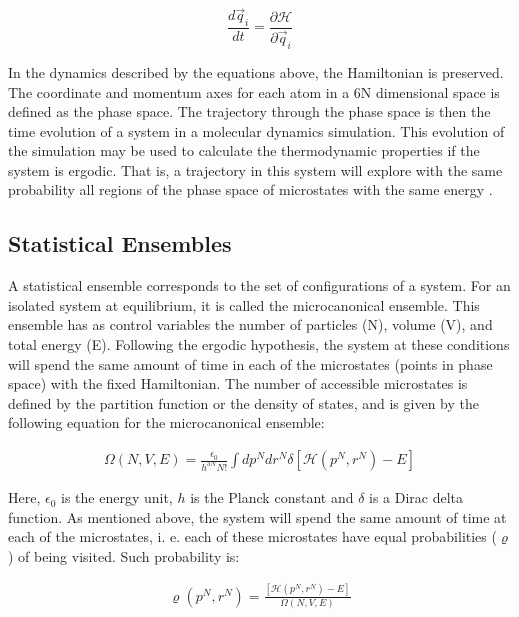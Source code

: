 \begin{equation}
\frac{d \vec{q}_{i}}{dt} =  \frac{\partial \mathcal{H}}{\partial \vec{q}_{i}}
\end{equation}

In the dynamics described by the equations above, the Hamiltonian is preserved. The coordinate and momentum axes for each atom in a 6N dimensional space is defined as the phase space. The trajectory through the phase space is then the time evolution of a system in a molecular dynamics simulation. This evolution of the simulation may be used to calculate the thermodynamic properties if the system is ergodic. That is, a trajectory in this system will explore with the same probability all regions of the phase space of microstates with the same energy \cite{shell2015}. 

\subsection{Statistical Ensembles}

A statistical ensemble corresponds to the set of configurations of a system. For an isolated system at equilibrium, it is called the microcanonical ensemble. This ensemble has as control variables the number of particles (N), volume (V), and total energy (E). Following the ergodic hypothesis, the system at these conditions will spend the same amount of time in each of the microstates (points in phase space) with the fixed Hamiltonian.  The number of accessible microstates is defined by the partition function or the density of states, and  is given by the following equation  for the microcanonical ensemble: 

\begin{equation}
\begin{aligned}
\Omega (N,V,E) = \frac{\epsilon_{0}}{h^{3N}N!} \int dp^{N} dr^{N} \delta [\mathcal{H}(p^{N},r^{N}) -E]
\end{aligned}
\end{equation}

Here, $\epsilon _{0}$ is the energy unit, $h$ is the Planck constant and $\delta$ is a Dirac delta function. As mentioned above, the system will spend the same amount of time at each of the microstates, i. e. each of these microstates have equal probabilities ($\varrho$) of being visited. Such probability is:

\begin{equation}
\begin{aligned}
\varrho (p^{N},r^{N}) = \frac{[\mathcal{H}(p^{N},r^{N}) -E]}{ \Omega (N,V,E)} 
\end{aligned}
\end{equation}

